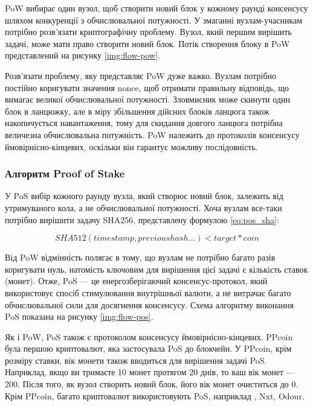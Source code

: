 \documentclass{lib/styles/default-style}
\begin{document}
    PoW вибирає один вузол, щоб створити новий блок у кожному раунді консенсусу шляхом конкуренції з
    обчислювальної потужності. У змаганні вузлам-учасникам потрібно розв'язати криптографічну проблему.
    Вузол, який першим вирішить задачі, може мати право створити новий блок.
    Потік створення блоку в PoW представлений на рисунку \ref{img:flow-pow}.


    Розв'язати проблему, яку представляє PoW дуже важко.
    Вузлам потрібно постійно коригувати значення nonce, щоб отримати правильну відповідь,
    що вимагає великої обчислювальної потужності.
    Зловмисник може скинути один блок в ланцюжку, але в міру збільшення дійсних блоків ланцюга
    також накопичується навантаження, тому для скидання довгого ланцюга потрібна величезна обчислювальна потужність.
    PoW належить до протоколів консенсусу ймовірнісно-кінцевих, оскільки він гарантує можливу послідовність.


    \subsubsection{Алгоритм Proof of Stake}

    У PoS вибір кожного раунду вузла, який створює новий блок, залежить від утримуваного кола, а не обчислювальної потужності.
    Хоча вузлам все-таки потрібно вирішити задачу SHA256, представлену формулою \ref{eq:pos_sha}:

    \begin{equation}
        SHA512(timestamp, previous hash...) < target*coin
        \label{eq:pos_sha}
    \end{equation}

    Від PoW відмінність полягає в тому, що вузлам не потрібно багато разів коригувати нуль,
    натомість ключовим для вирішення цієї задачі є кількість ставок (монет).
    Отже, PoS --- це енергозберігаючий консенсус-протокол, який використовує спосіб стимулювання внутрішньої валюти,
    а не витрачає багато обчислювальної сили для досягнення консенсусу.
    Схема алгоритму виконання PoS показана на рисунку \ref{img:flow-pos}.
      

    Як і PoW, PoS також є протоколом консенсусу ймовірнісно-кінцевих.
    PPcoin була першою криптовалют, яка застосувала PoS до блокчейн.
    У PPcoin, крім розміру ставки, вік монети також вводиться для вирішення задачі PoS.
    Наприклад, якщо ви тримаєте 10 монет протягом 20 днів, то ваш вік монет --- 200.
    Після того, як вузол створить новий блок, його вік монет очиститься до 0.
    Крім PPcoin, багато криптовалют використовують PoS, наприклад , Nxt, Odour.
\end{document}
